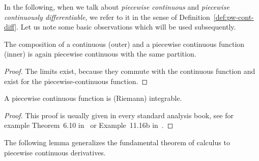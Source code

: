     In the following, when we talk about \emph{piecewise continuous} and \emph{piecewise continuously differentiable}, we refer to it in the sense of Definition~\ref{def:pw-cont-diff}.
    Let us note some basic observations which will be used subsequently.

    \begin{lemma}\label{lm:comp-pw-cont}
        The composition of a continuous (outer) and a piecewise continuous function (inner) is again piecewise continuous with the same partition.
    \end{lemma}
    \begin{proof}
        The limits exist, because they commute with the continuous function and exist for the piecewise-continuous function.
    \end{proof}

    \begin{lemma}\label{lm:pc-integrable}
        A piecewise continuous function is (Riemann) integrable.
    \end{lemma}
    \begin{proof}
        This proof is usually given in every standard analysis book, see for example Theorem~6.10 in~\cite{Rudin76PrinciplesAnalysis} or Example~11.16b in~\cite{Gathmann12GDM}.
    \end{proof}

    The following lemma generalizes the fundamental theorem of calculus to piecewise continuous derivatives.

